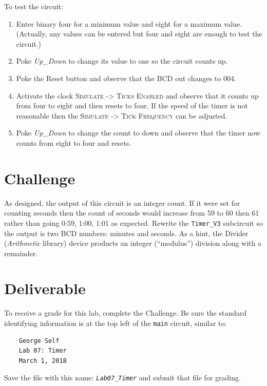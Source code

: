 To test the circuit:

\begin{enumerate}
	\item Enter binary four for a minimum value and eight for a maximum value. (Actually, any values can be entered but four and eight are enough to test the circuit.) 
	\item Poke \textit{Up\_Down} to change its value to one so the circuit counts up.
	\item Poke the Reset button and observe that the BCD out changes to 004.
	\item Activate the clock \textsc{Simulate -> Ticks Enabled} and observe that it counts up from four to eight and then resets to four. If the speed of the timer is not reasonable then the \textsc{Simulate -> Tick Frequency} can be adjusted.
	\item Poke \textit{Up\_Down} to change the count to down and observe that the timer now counts from eight to four and resets.
\end{enumerate}

\section{Challenge}

As designed, the output of this circuit is an integer count. If it were set for counting seconds then the count of seconds would increase from 59 to 60 then 61 rather than going 0:59, 1:00, 1:01 as expected. Rewrite the \lstinline[columns=fixed]|Timer_V3| subcircuit so the output is two BCD numbers: minutes and seconds. As a hint, the Divider (\textit{Arithmetic} library) device products an integer (``modulus'') division along with a remainder.

\section{Deliverable}

To receive a grade for this lab, complete the Challenge. Be sure the standard identifying information is at the top left of the \lstinline{main} circuit, similar to: 

\bigskip
\begin{minipage}{\linewidth}
	\begin{verbatim}
	George Self
	Lab 07: Timer
	March 1, 2018
	\end{verbatim}
\end{minipage}
\bigskip

Save the file with this name: \emph{\texttt{Lab07\_Timer}} and submit that file for grading.

